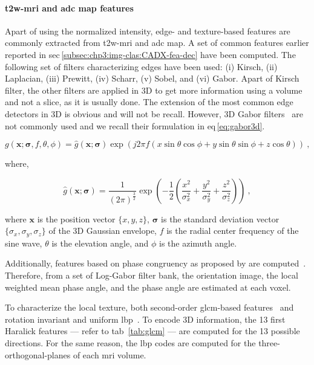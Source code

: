 \paragraph{\ac{t2w}-\ac{mri} and \ac{adc} map features}
Apart of using the normalized intensity, edge- and texture-based features are commonly extracted from \ac{t2w}-\ac{mri} and \ac{adc} map.
A set of common features earlier reported in \acs*{sec}\,\ref{subsec:chp3:img-clas:CADX-fea-dec} have been computed.
The following set of filters characterizing edges have been used: (i) Kirsch, (ii) Laplacian, (iii) Prewitt, (iv) Scharr, (v) Sobel, and (vi) Gabor.
Apart of Kirsch filter, the other filters are applied in 3D to get more information using a volume and not a slice, as it is usually done.
The extension of the most common edge detectors in 3D is obvious and will not be recall.
However, 3D Gabor filters~\cite{wang2005face} are not commonly used and we recall their formulation in \acs*{eq}\,\eqref{eq:gabor3d}.

\begin{equation}
  g(\mathbf{x};\boldsymbol{\sigma},f,\theta,\phi) = \hat{g}(\mathbf{x};\boldsymbol{\sigma}) \exp(j 2 \pi f \left( x \sin \theta \cos \phi + y \sin \theta \sin \phi + z \cos \theta \right)) \ ,
  \label{eq:gabor3d}
\end{equation}

\noindent where,

\begin{equation}
  \hat{g}(\mathbf{x};\boldsymbol{\sigma}) = \frac{1}{{\left(2 \pi\right)}^{\frac{3}{2}}} \exp \left( -\frac{1}{2} \left( \frac{x^2}{\sigma_x^2} + \frac{y^2}{\sigma_y^2} + \frac{z^2}{\sigma_z^2} \right) \right) \ ,
  \label{eq:gabor3dgaussian}
\end{equation}

\noindent where $\mathbf{x}$ is the position vector $\{x,y,z\}$, $\boldsymbol{\sigma}$ is the standard deviation vector $\{\sigma_x,\sigma_y,\sigma_z\}$ of the 3D Gaussian envelope, $f$ is the radial center frequency of the sine wave, $\theta$ is the elevation angle, and $\phi$ is the azimuth angle.

Additionally, features based on phase congruency as proposed by \citeauthor{kovesi1999image} are computed~\cite{kovesi1999image}.
Therefore, from a set of Log-Gabor filter bank, the orientation image, the local weighted mean phase angle, and the phase angle are estimated at each voxel.

To characterize the local texture, both second-order \ac{glcm}-based features~\cite{Haralick1973} and rotation invariant and uniform \ac{lbp}~\cite{ojala2002multiresolution}.
To encode 3D information, the 13 first Haralick features --- refer to \acs{tab}~\ref{tab:glcm} --- are computed for the 13 possible directions.
For the same reason, the \ac{lbp} codes are computed for the three-orthogonal-planes of each \ac{mri} volume.

